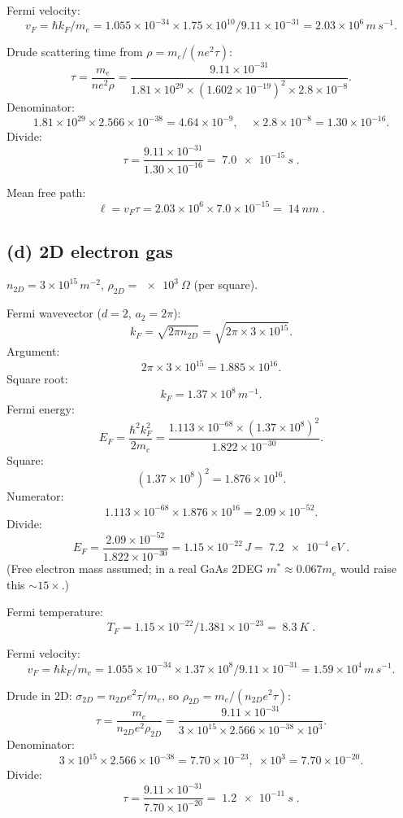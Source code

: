 \documentclass[11pt]{article}
\begin{document}
Fermi velocity:
\[
v_F = \hbar k_F/m_e = 1.055\times 10^{-34}\times 1.75\times 10^{10}/9.11\times 10^{-31} = 2.03\times 10^{6}\,\si{m\,s^{-1}}.
\]

Drude scattering time from $\rho = m_e/(ne^2\tau)$:
\[
\tau = \frac{m_e}{n e^2 \rho} = \frac{9.11\times 10^{-31}}{1.81\times 10^{29}\times (1.602\times 10^{-19})^2\times 2.8\times 10^{-8}}.
\]
Denominator:
\[
1.81\times 10^{29}\times 2.566\times 10^{-38} = 4.64\times 10^{-9},\quad \times 2.8\times 10^{-8}=1.30\times 10^{-16}.
\]
Divide:
\[
\tau = \frac{9.11\times 10^{-31}}{1.30\times 10^{-16}} = \boxed{\;\SI{7.0e-15}{s}\;}.
\]

Mean free path:
\[
\ell = v_F\tau = 2.03\times 10^6\times 7.0\times 10^{-15} = \boxed{\;\SI{14}{nm}\;}.
\]

\subsection*{(d) 2D electron gas}

$n_{2D} = 3\times 10^{15}\,\si{m^{-2}}$, $\rho_{2D} = \SI{e3}{\Omega}$ (per square).

Fermi wavevector ($d=2$, $a_2=2\pi$):
\[
k_F = \sqrt{2\pi n_{2D}} = \sqrt{2\pi\times 3\times 10^{15}}.
\]
Argument:
\[
2\pi\times 3\times 10^{15} = 1.885\times 10^{16}.
\]
Square root:
\[
k_F = 1.37\times 10^{8}\,\si{m^{-1}}.
\]
Fermi energy:
\[
E_F = \frac{\hbar^2 k_F^2}{2m_e} = \frac{1.113\times 10^{-68}\times (1.37\times 10^8)^2}{1.822\times 10^{-30}}.
\]
Square:
\[
(1.37\times 10^8)^2 = 1.876\times 10^{16}.
\]
Numerator:
\[
1.113\times 10^{-68}\times 1.876\times 10^{16} = 2.09\times 10^{-52}.
\]
Divide:
\[
E_F = \frac{2.09\times 10^{-52}}{1.822\times 10^{-30}} = 1.15\times 10^{-22}\,\si{J} = \boxed{\;\SI{7.2e-4}{eV}\;}.
\]
(Free electron mass assumed; in a real GaAs 2DEG $m^*\approx 0.067 m_e$ would raise this $\sim15\times$.)

Fermi temperature:
\[
T_F = 1.15\times 10^{-22}/1.381\times 10^{-23} = \boxed{\;\SI{8.3}{K}\;}.
\]

Fermi velocity:
\[
v_F = \hbar k_F/m_e = 1.055\times 10^{-34}\times 1.37\times 10^8/9.11\times 10^{-31} = 1.59\times 10^4\,\si{m\,s^{-1}}.
\]

Drude in 2D: $\sigma_{2D} = n_{2D} e^2 \tau/m_e$, so $\rho_{2D} = m_e/(n_{2D} e^2 \tau)$:
\[
\tau = \frac{m_e}{n_{2D} e^2 \rho_{2D}} = \frac{9.11\times 10^{-31}}{3\times 10^{15}\times 2.566\times 10^{-38}\times 10^3}.
\]
Denominator:
\[
3\times 10^{15}\times 2.566\times 10^{-38} = 7.70\times 10^{-23},\;\times 10^3 = 7.70\times 10^{-20}.
\]
Divide:
\[
\tau = \frac{9.11\times 10^{-31}}{7.70\times 10^{-20}} = \boxed{\;\SI{1.2e-11}{s}\;}.
\]
\end{document}
